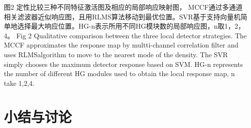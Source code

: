  
图2 定性比较三种不同特征激活图及相应的局部响应映射图， MCCF通过多通道相关滤波器近似响应图，且用RLMS算法移动到最优位置。SVR基于支持向量机简单地选择最大响应位置。HG-n表示所用不同HG模块数的局部响应图，n取1，2，4。
Fig 2 Qualitative comparison between the three local detector strategies. The MCCF approximates the response map by multti-channel correlation filter and uses RLMSalgorithm to move to the nearest mode of the density. The SVR simply chooses the maximum detector response based on SVM. HG-n represents the number of different HG modules used to obtain the local response map, n take 1,2,4.
 
\section{小结与讨论}


